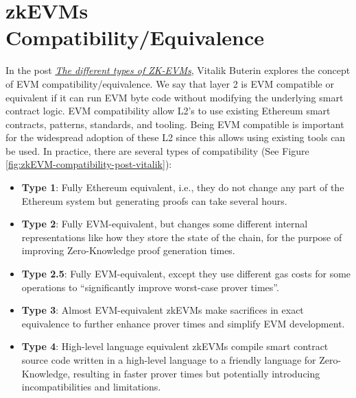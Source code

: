 


\section{zkEVMs Compatibility/Equivalence}

In the post \href{https://vitalik.eth.limo/general/2022/08/04/zkevm.html}{\textit{The different types of ZK-EVMs}}, Vitalik Buterin explores the concept of EVM compatibility/equivalence. We say that layer 2 is EVM compatible or equivalent if it can run EVM byte code without modifying the underlying smart contract logic. EVM compatibility allow L2’s to use existing Ethereum smart contracts, patterns, standards, and tooling. Being EVM compatible is important for the
widespread adoption of these L2 since this allows using existing tools can be used. In practice, there are several types of compatibility (See Figure \ref{fig:zkEVM-compatibility-post-vitalik}):

\begin{itemize}

\item \textbf{Type 1}: Fully Ethereum equivalent, i.e., they do not change any part of the Ethereum system but generating proofs can take several hours.

\item \textbf{Type 2}: Fully EVM-equivalent, but changes some different internal representations like how they store the state of the chain, for the purpose of improving Zero-Knowledge proof generation times.

\item \textbf{Type 2.5}: Fully EVM-equivalent, except they use different gas costs for some operations to ``significantly improve worst-case prover times''.

\item \textbf{Type 3}: Almost EVM-equivalent zkEVMs make sacrifices in exact equivalence to further enhance prover times and simplify EVM development.

\item \textbf{Type 4}: High-level language equivalent zkEVMs compile smart contract source code written in a high-level language to a friendly language for Zero-Knowledge, resulting in faster prover times but potentially introducing incompatibilities and limitations.

\end{itemize}

